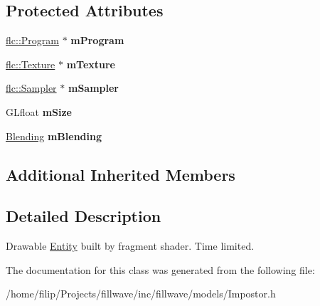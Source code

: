 \subsection*{Protected Attributes}
\begin{DoxyCompactItemize}
\item 
\hyperlink{classflw_1_1flc_1_1Program}{flc\+::\+Program} $\ast$ {\bfseries m\+Program}\hypertarget{classflw_1_1flf_1_1Impostor_ac5fc51278468676481f5d26523b90aa6}{}\label{classflw_1_1flf_1_1Impostor_ac5fc51278468676481f5d26523b90aa6}

\item 
\hyperlink{classflw_1_1flc_1_1Texture}{flc\+::\+Texture} $\ast$ {\bfseries m\+Texture}\hypertarget{classflw_1_1flf_1_1Impostor_a79b817d46dd91909fc060ff0b557bde0}{}\label{classflw_1_1flf_1_1Impostor_a79b817d46dd91909fc060ff0b557bde0}

\item 
\hyperlink{classflw_1_1flc_1_1Sampler}{flc\+::\+Sampler} $\ast$ {\bfseries m\+Sampler}\hypertarget{classflw_1_1flf_1_1Impostor_abfec71be3aa6a5e08ae046f81484f0a3}{}\label{classflw_1_1flf_1_1Impostor_abfec71be3aa6a5e08ae046f81484f0a3}

\item 
G\+Lfloat {\bfseries m\+Size}\hypertarget{classflw_1_1flf_1_1Impostor_a3c0213e10db85ca55391c1629e82397a}{}\label{classflw_1_1flf_1_1Impostor_a3c0213e10db85ca55391c1629e82397a}

\item 
\hyperlink{structflw_1_1flf_1_1Blending}{Blending} {\bfseries m\+Blending}\hypertarget{classflw_1_1flf_1_1Impostor_a36c13287a923fc431368cf82f8d6d358}{}\label{classflw_1_1flf_1_1Impostor_a36c13287a923fc431368cf82f8d6d358}

\end{DoxyCompactItemize}
\subsection*{Additional Inherited Members}


\subsection{Detailed Description}
Drawable \hyperlink{classflw_1_1flf_1_1Entity}{Entity} built by fragment shader. Time limited. 

The documentation for this class was generated from the following file\+:\begin{DoxyCompactItemize}
\item 
/home/filip/\+Projects/fillwave/inc/fillwave/models/Impostor.\+h\end{DoxyCompactItemize}
